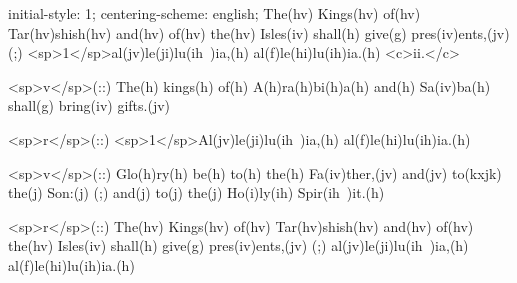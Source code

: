 initial-style: 1;
centering-scheme: english;
The(hv) Kings(hv) of(hv) Tar(hv)shish(hv) and(hv) of(hv) the(hv) Isles(iv) shall(h) give(g) pres(iv)ents,(jv) (;) <sp>1</sp>al(jv)le(ji)lu(ih~)ia,(h) al(f)le(hi)lu(ih)ia.(h) <c>ii.</c>

<sp>v</sp>(::) The(h) kings(h) of(h) A(h)ra(h)bi(h)a(h) and(h) Sa(iv)ba(h) shall(g) bring(iv) gifts.(jv)

<sp>r</sp>(::) <sp>1</sp>Al(jv)le(ji)lu(ih~)ia,(h) al(f)le(hi)lu(ih)ia.(h)

<sp>v</sp>(::) Glo(h)ry(h) be(h) to(h) the(h) Fa(iv)ther,(jv) and(jv) to(kxjk) the(j) Son:(j) (;) and(j) to(j) the(j) Ho(i)ly(ih) Spir(ih~)it.(h)

<sp>r</sp>(::) The(hv) Kings(hv) of(hv) Tar(hv)shish(hv) and(hv) of(hv) the(hv) Isles(iv) shall(h) give(g) pres(iv)ents,(jv) (;) al(jv)le(ji)lu(ih~)ia,(h) al(f)le(hi)lu(ih)ia.(h)